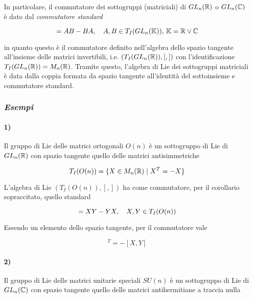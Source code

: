 In particolare, il commutatore dei sottogruppi (matriciali) di $ GL_{n}(\mathbb{R}) $ o $ GL_{n}(\mathbb{C}) $ è dato dal \textit{commutatore standard}

\begin{equation}
	[A,B] = A B - B A \qcomma A,B \in T_{I}(GL_{n}(\K)), \, \K = \R \lor \C
\end{equation}

in quanto questo è il commutatore definito nell'algebra dello spazio tangente all'insieme delle matrici invertibili, i.e. $ (T_{I}(GL_{n}(\mathbb{R})),[,]) $ con l'identificazione $ T_{I}(GL_{n}(\mathbb{R})) = M_{n}(\mathbb{R}) $. Tramite questo, l'algebra di Lie dei sottogruppi matriciali è data dalla coppia formata da spazio tangente all'identità del sottoinsieme e commutatore standard.

\subsubsection{\textit{Esempi}}

\paragraph{1)}

Il gruppo di Lie delle matrici ortogonali $ O(n) $ è un sottogruppo di Lie di $ GL_{n}(\mathbb{R}) $ con spazio tangente quello delle matrici antisimmetriche

\begin{equation}
	T_{I}(O(n)) = \{ X \in M_{n}(\mathbb{R}) \mid X^{T} = -X \}
\end{equation}

L'algebra di Lie $ (T_{I}(O(n)),[,]) $ ha come commutatore, per il corollario sopraccitato, quello standard

\begin{equation}
	[X,Y] = X Y - Y X \qcomma X,Y \in T_{I}(O(n))
\end{equation}

Essendo un elemento dello spazio tangente, per il commutatore vale

\begin{equation}
	[X,Y]^{T} = - [X,Y]
\end{equation}

\paragraph{2)}

Il gruppo di Lie delle matrici unitarie speciali $ SU(n) $ è un sottogruppo di Lie di $ GL_{n}(\mathbb{C}) $ con spazio tangente quello delle matrici antihermitiane a traccia nulla

